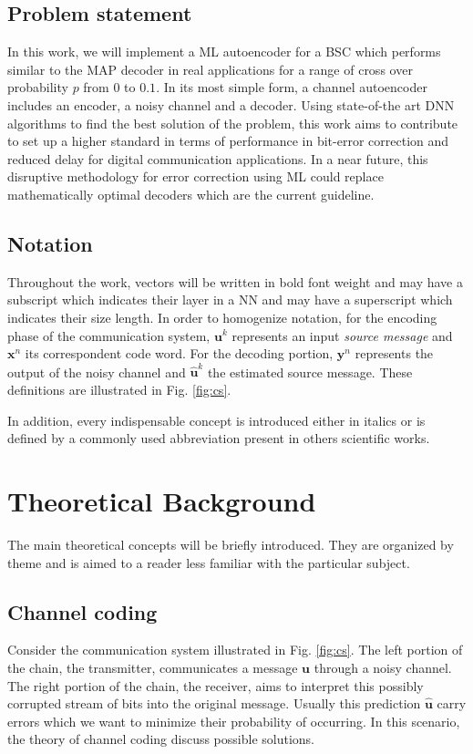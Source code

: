 \documentclass[conference]{IEEEtran}
\begin{document}
\subsection{Problem statement}

In this work, we will implement a ML autoencoder for a BSC which performs similar to the MAP decoder in real applications for a range of cross over probability $p$ from $0$ to $0.1$. In its most simple form, a channel autoencoder includes an encoder, a noisy channel and a decoder. Using state-of-the art DNN algorithms to find the best solution of the problem, this work aims to contribute to set up a higher standard in terms of performance in bit-error correction and reduced delay for digital communication applications. In a near future, this disruptive methodology for error correction using ML could replace mathematically optimal decoders which are the current guideline.


\subsection{Notation}
Throughout the work, vectors will be written in bold font weight and may  have a subscript which indicates their layer in a NN and may have a superscript which indicates their size length. In order to homogenize notation, for the encoding phase of the communication system, $\textbf{u}^k$ represents an input \textit{source message} and $\textbf{x}^n$ its correspondent code word. For the decoding portion, $\textbf{y}^n$ represents the output of the noisy channel and $\hat{\textbf{u}}^k$ the estimated source message. These definitions are illustrated in Fig. \ref{fig:cs}.

In addition, every indispensable concept is introduced either in italics or is defined by a commonly used abbreviation present in others scientific works.


\section{Theoretical Background}

The main theoretical concepts will be briefly introduced. They are organized by theme and is aimed to a reader less familiar with the particular subject. 

\subsection{Channel coding}
Consider the communication system illustrated in Fig. \ref{fig:cs}. The left portion of the chain, the transmitter, communicates a message $\textbf{u}$ through a noisy channel. The right portion of the chain, the receiver, aims to interpret this possibly corrupted stream of bits into the original message. Usually this prediction $\hat{\textbf{u}}$ carry errors which we want to minimize their probability of occurring. In this scenario, the theory of channel coding discuss possible solutions. 
\end{document}
